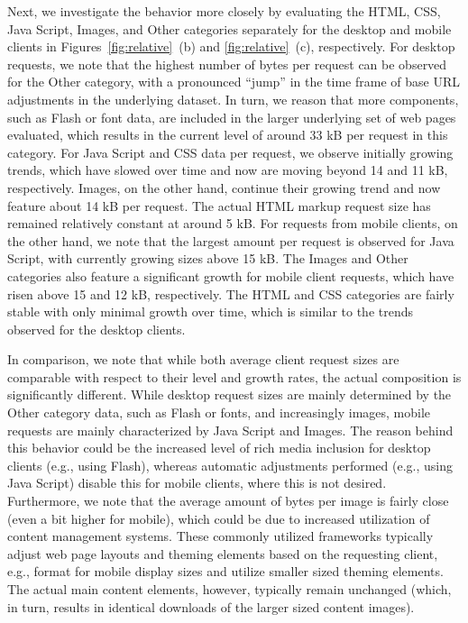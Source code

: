 \documentclass[journal,final]{IEEEtran}
\begin{document}
Next, we investigate the behavior more closely by evaluating the HTML, CSS, Java Script, Images, and Other categories separately for the desktop and mobile clients in Figures~\ref{fig:relative}~(b) and \ref{fig:relative}~(c), respectively.
For desktop requests, we note that the highest number of bytes per request can be observed for the Other category, with a pronounced ``jump'' in the time frame of base URL adjustments in the underlying dataset. 
In turn, we reason that more components, such as Flash or font data, are included in the larger underlying set of web pages evaluated, which results in the current level of around 33 kB per request in this category.
For Java Script and CSS data per request, we observe  initially growing trends, which have slowed over time and now are moving beyond 14 and 11 kB, respectively.
Images, on the other hand, continue their growing trend and now feature about 14 kB per request.
The actual HTML markup request size has remained relatively constant at around 5 kB.
For requests from mobile clients, on the other hand, we note that the largest amount per request is observed for Java Script, with currently growing sizes above 15 kB.
The Images and Other categories also feature a significant growth for mobile client requests, which have risen above 15 and 12 kB, respectively.
The HTML and CSS categories are fairly stable with only minimal growth over time, which is similar to the trends observed for the desktop clients.

In comparison, we note that while both average client request sizes are comparable with respect to their level and growth rates, the actual composition is significantly different. 
While desktop request sizes are mainly determined by the Other category data, such as Flash or fonts, and increasingly images, mobile requests are mainly characterized by Java Script and Images.
The reason behind this behavior could be the increased level of rich media inclusion for desktop clients (e.g., using Flash), whereas automatic adjustments performed (e.g., using Java Script) disable this for mobile clients, where this is not desired. 
Furthermore, we note that the average amount of bytes per image is fairly close (even a bit higher for mobile), which could be due to increased utilization of content management systems.
These commonly utilized frameworks typically adjust web page layouts and theming elements based on the requesting client, e.g., format for mobile display sizes and utilize smaller sized theming elements. The actual main content elements, however, typically remain unchanged (which, in turn, results in identical downloads of the larger sized content images).
\end{document}
